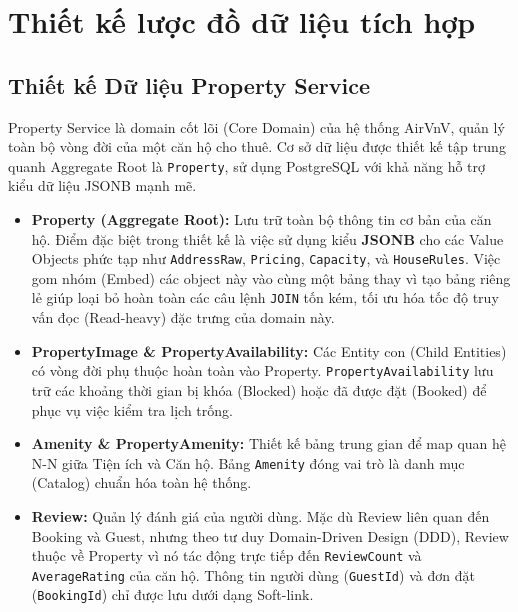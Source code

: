\section{Thiết kế lược đồ dữ liệu tích hợp}
\label{sec:luoc_do_du_lieu}

%
%
\subsection{Thiết kế Dữ liệu Property Service}
Property Service là domain cốt lõi (Core Domain) của hệ thống AirVnV, quản lý toàn bộ vòng đời của một căn hộ cho thuê. Cơ sở dữ liệu được thiết kế tập trung quanh Aggregate Root là \texttt{Property}, sử dụng PostgreSQL với khả năng hỗ trợ kiểu dữ liệu JSONB mạnh mẽ.

\begin{itemize}
  \item \textbf{Property (Aggregate Root):} Lưu trữ toàn bộ thông tin cơ bản của căn hộ. Điểm đặc biệt trong thiết kế là việc sử dụng kiểu \textbf{JSONB} cho các Value Objects phức tạp như \texttt{AddressRaw}, \texttt{Pricing}, \texttt{Capacity}, và \texttt{HouseRules}. Việc gom nhóm (Embed) các object này vào cùng một bảng thay vì tạo bảng riêng lẻ giúp loại bỏ hoàn toàn các câu lệnh \texttt{JOIN} tốn kém, tối ưu hóa tốc độ truy vấn đọc (Read-heavy) đặc trưng của domain này.
  \item \textbf{PropertyImage \& PropertyAvailability:} Các Entity con (Child Entities) có vòng đời phụ thuộc hoàn toàn vào Property. \texttt{PropertyAvailability} lưu trữ các khoảng thời gian bị khóa (Blocked) hoặc đã được đặt (Booked) để phục vụ việc kiểm tra lịch trống.
  \item \textbf{Amenity \& PropertyAmenity:} Thiết kế bảng trung gian để map quan hệ N-N giữa Tiện ích và Căn hộ. Bảng \texttt{Amenity} đóng vai trò là danh mục (Catalog) chuẩn hóa toàn hệ thống.
  \item \textbf{Review:} Quản lý đánh giá của người dùng. Mặc dù Review liên quan đến Booking và Guest, nhưng theo tư duy Domain-Driven Design (DDD), Review thuộc về Property vì nó tác động trực tiếp đến \texttt{ReviewCount} và \texttt{AverageRating} của căn hộ. Thông tin người dùng (\texttt{GuestId}) và đơn đặt (\texttt{BookingId}) chỉ được lưu dưới dạng Soft-link.
\end{itemize}

